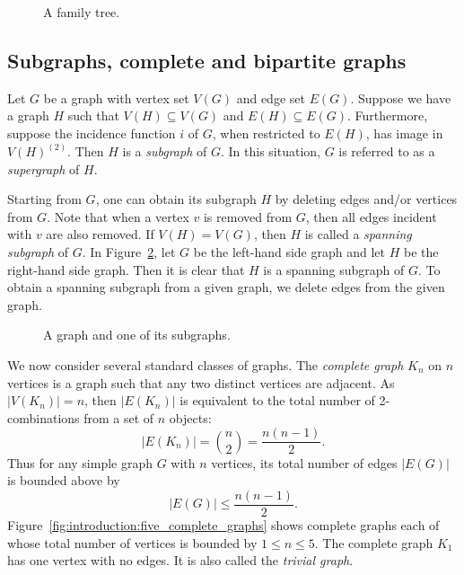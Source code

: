 \begin{figure}[!htbp]
\centering
{}

\caption{A family tree.}
\label{fig:introduction:family_tree}
\end{figure}



\subsection{Subgraphs, complete and bipartite graphs}

Let $G$ be a graph with vertex set $V(G)$ and edge set $E(G)$. Suppose
we have a graph $H$ such that $V(H) \subseteq V(G)$ and
$E(H) \subseteq E(G)$. Furthermore, suppose the incidence function $i$
of $G$, when restricted to $E(H)$, has image in $V(H)^{(2)}$. Then $H$
is a \emph{subgraph} of $G$. In this situation, $G$ is
referred to as a \emph{supergraph} of $H$.

Starting from $G$, one can obtain its subgraph $H$ by deleting edges
and/or vertices from $G$. Note that when a vertex $v$ is removed from
$G$, then all edges incident with $v$ are also removed. If
$V(H) = V(G)$, then $H$ is called a
\emph{spanning subgraph} of $G$. In
Figure~\ref{fig:introduction:star_subgraph}, let $G$ be the left-hand
side graph and let $H$ be the right-hand side graph. Then it is clear
that $H$ is a spanning subgraph of $G$. To obtain a spanning subgraph
from a given graph, we delete edges from the given graph.

\begin{figure}[!htbp]
\centering

\caption{A graph and one of its subgraphs.}
\label{fig:introduction:star_subgraph}
\end{figure}

We now consider several standard classes of graphs. The
\emph{complete graph} $K_n$ on $n$
vertices is a graph such that any two distinct vertices are
adjacent. As $|V(K_n)| = n$, then $|E(K_n)|$ is equivalent to the
total number of 2-combinations from a set of $n$ objects:
\begin{equation}
\label{eqn:introduction:size_of_K_n}
|E(K_n)|
=
\binom{n}{2}
=
\frac{n(n-1)}{2}.
\end{equation}
Thus for any simple graph $G$ with $n$ vertices, its total number of
edges $|E(G)|$ is bounded above by
\begin{equation}
\label{eqn:introduction:upper_bound_total_edges_simple_graph}
|E(G)|
\leq
\frac{n(n - 1)}{2}.
\end{equation}
Figure~\ref{fig:introduction:five_complete_graphs} shows complete
graphs each of whose total number of vertices is bounded by
$1 \leq n \leq 5$. The complete graph $K_1$ has one vertex with
no edges. It is also called the
\emph{trivial graph}.

